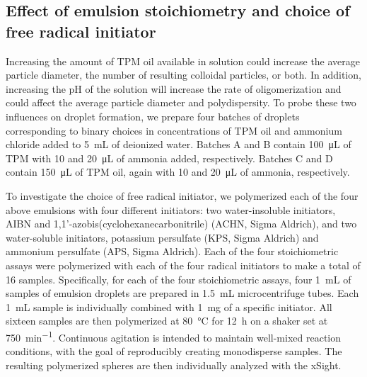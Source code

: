 \subsection{Effect of emulsion stoichiometry and choice of free radical initiator}

Increasing the amount of TPM oil available in solution could increase the
average particle diameter, the number of resulting colloidal particles, or both.
In addition, increasing the pH of the solution will increase the rate of
oligomerization and could affect the average particle diameter and polydispersity.
To probe these two influences on droplet formation, we prepare four batches of droplets
corresponding to binary choices in concentrations of TPM oil and ammonium chloride
added to \SI{5}{\milli\liter} of deionized water.
Batches A and B contain
\SI{100}{\micro\liter} of TPM with \si{10} and \SI{20}{\micro\liter} of 
ammonia added, respectively. Batches C and D contain \SI{150}{\micro\liter} of TPM oil, 
again with \si{10} and \SI{20}{\micro\liter} of ammonia, respectively.



To investigate the choice of free radical initiator, we polymerized each of the four
above emulsions with four different initiators:
two water-insoluble initiators, AIBN and
\num{1},\num{1}'-azobis(cyclohexanecarbonitrile) (ACHN, Sigma Aldrich),
and two water-soluble  initiators, potassium persulfate (KPS, Sigma Aldrich) and
ammonium persulfate (APS, Sigma Aldrich).
Each of the four stoichiometric assays were polymerized with each of the four
radical initiators to make a total of \num{16} samples.
Specifically, for each of the four stoichiometric assays, four \SI{1}{\milli\liter} of
samples of emulsion droplets are prepared in \SI{1.5}{\milli\liter} microcentrifuge tubes.
Each \SI{1}{\milli\liter} sample is individually combined with \SI{1}{\milli\gram} of
a specific initiator.
All sixteen samples are then polymerized at \SI{80}{\celsius} for \SI{12}{\hour}
on a shaker set at \SI{750}{\minute^{-1}}. Continuous agitation is intended to
maintain well-mixed reaction conditions, with the goal of reproducibly creating
monodisperse samples.
The resulting polymerized spheres are then individually analyzed with the xSight.


